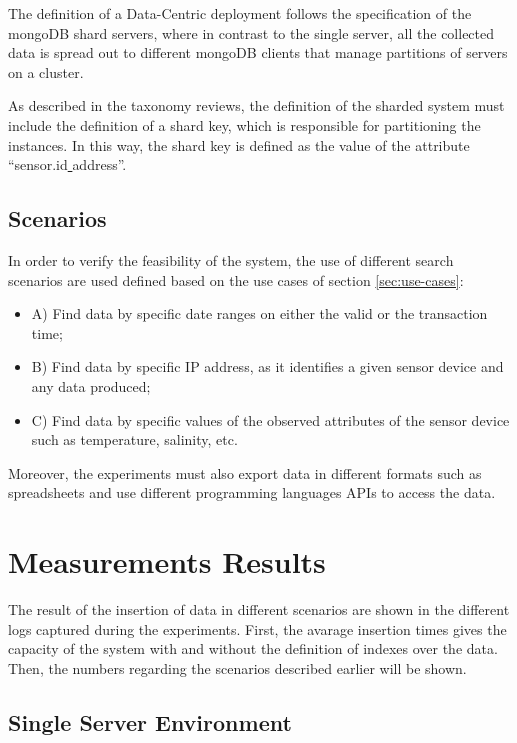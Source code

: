 The definition of a Data-Centric deployment follows the specification of the
mongoDB shard servers, where in contrast to the single server, all the
collected data is spread out to different mongoDB clients that manage
partitions of servers on a cluster. 

As described in the taxonomy reviews, the definition of the sharded system must
include the definition of a shard key, which is responsible for partitioning
the instances. In this way, the shard key is defined as the value of the
attribute ``sensor.id\underline{ }address''.

\subsection{Scenarios}
\label{sec:exp-scenarios}

In order to verify the feasibility of the system, the use of different search
scenarios are used defined based on the use cases of section
\ref{sec:use-cases}:

\begin{itemize}
  \item A) Find data by specific date ranges on either the valid or the
  transaction time;
  \item B) Find data by specific IP address, as it identifies a given sensor
  device and any data produced;
  \item C) Find data by specific values of the observed attributes of the sensor
  device such as temperature, salinity, etc.
\end{itemize}

Moreover, the experiments must also export data in different formats such as 
spreadsheets and use different programming languages APIs to access the data.

\section{Measurements Results}
\label{sec:exp-measurements}

The result of the insertion of data in different scenarios are shown in the
different logs captured during the experiments. First, the avarage insertion
times gives the capacity of the system with and without the definition of
indexes over the data. Then, the numbers regarding the scenarios described
earlier will be shown.

\subsection{Single Server Environment}

